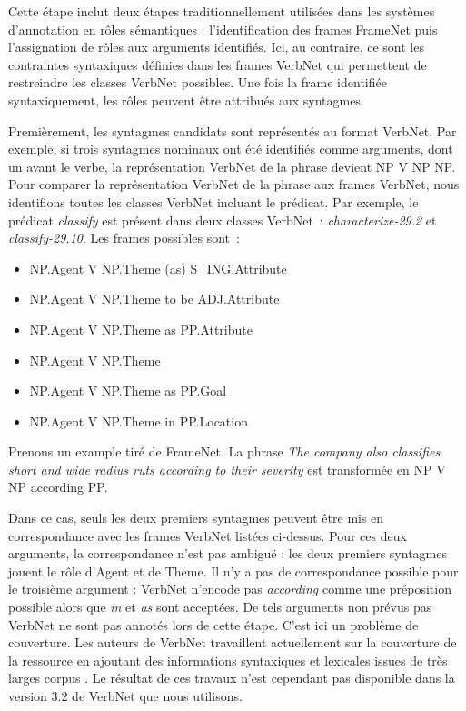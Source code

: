 Cette étape inclut deux étapes traditionnellement utilisées dans les systèmes
d'annotation en rôles sémantiques \citep{gildea2002automatic,das2014frame} :
l'identification des frames FrameNet puis l'assignation de rôles aux arguments
identifiés. Ici, au contraire, ce sont les contraintes syntaxiques définies
dans les frames VerbNet qui permettent de restreindre les classes VerbNet
possibles. Une fois la frame identifiée syntaxiquement, les rôles peuvent être
attribués aux syntagmes.

Premièrement, les syntagmes candidats sont représentés au format VerbNet. Par
exemple, si trois syntagmes nominaux ont été identifiés comme arguments, dont
un avant le verbe, la représentation VerbNet de la phrase devient NP V NP NP.
Pour comparer la représentation VerbNet de la phrase aux frames VerbNet, nous
identifions toutes les classes VerbNet incluant le prédicat. Par exemple, le
prédicat \emph{classify} est présent dans deux classes VerbNet~:
\emph{characterize-29.2} et \emph{classify-29.10}. Les frames possibles
sont~:

\begin{itemize}
    \item NP.Agent V NP.Theme (as) S\_ING.Attribute
    \item NP.Agent V NP.Theme to be ADJ.Attribute
    \item NP.Agent V NP.Theme as PP.Attribute
    \item NP.Agent V NP.Theme
    \item NP.Agent V NP.Theme as PP.Goal
    \item NP.Agent V NP.Theme in PP.Location
\end{itemize}

Prenons un example tiré de FrameNet. La phrase \emph{The company also
classifies short and wide radius ruts according to their severity} est
transformée en NP V NP according PP.

Dans ce cas, seuls les deux premiers syntagmes peuvent être mis en
correspondance avec les frames VerbNet listées ci-dessus. Pour ces deux
arguments, la correspondance n'est pas ambiguë : les deux premiers syntagmes
jouent le rôle d'Agent et de Theme. Il n'y a pas de correspondance possible
pour le troisième argument : VerbNet n'encode pas \emph{according} comme une
préposition possible alors que \emph{in} et \emph{as} sont acceptées. De tels
arguments non prévus pas VerbNet ne sont pas annotés lors de cette étape. C'est
ici un problème de couverture. Les auteurs de VerbNet travaillent actuellement
sur la couverture de la ressource en ajoutant des informations syntaxiques et
lexicales issues de très larges corpus \citep{bonial2013expanding}. Le résultat
de ces travaux n'est cependant pas disponible dans la version 3.2 de VerbNet
que nous utilisons.

